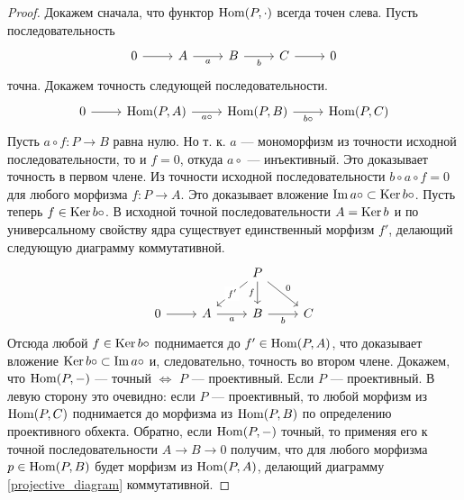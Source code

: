 \documentclass[../hw_main.tex]{subfiles}
\begin{document}
\begin{proof}
Докажем сначала, что функтор $\operatorname{Hom}(P, \cdot)$ всегда точен слева. Пусть последовательность
\begin{equation*}
    \begin{tikzcd}
	0 & A & B & C & 0
	\arrow[from=1-1, to=1-2]
	\arrow["a"', from=1-2, to=1-3]
	\arrow["b"', from=1-3, to=1-4]
	\arrow[from=1-4, to=1-5]
\end{tikzcd}
\end{equation*}
точна. Докажем точность следующей последовательности.
\begin{equation*}
    \begin{tikzcd}
	0 & {\Hom(P, A)} & {\Hom(P, B)} & {\Hom(P, C)}
	\arrow[from=1-1, to=1-2]
	\arrow["b\circ"', from=1-3, to=1-4]
	\arrow["a\circ"', from=1-2, to=1-3]
\end{tikzcd}
\end{equation*}
 Пусть $a\circ f:P\to B$ равна нулю. Но т. к. $a$ --- мономорфизм из точности исходной последовательности, то и $f=0$, откуда $a\circ$ --- инъективный. Это доказывает точность в первом члене.
Из точности исходной последовательности $b\circ a \circ f = 0$ для любого морфизма $f:P\to A$. Это доказывает вложение $\mathop{\mathrm{Im}}\nolimits a\circ \subset \mathop{\mathrm{Ker}}\nolimits b\circ$. Пусть теперь $f \in \mathop{\mathrm{Ker}}\nolimits b\circ$. В исходной точной последовательности $A = \mathop{\mathrm{Ker}}\nolimits b$ и по универсальному свойству ядра существует единственный морфизм $f'$, делающий следующую диаграмму коммутативной.
 \begin{equation}\label{projective_diagram}
     \begin{tikzcd}
	&& P \\
	0 & A & B & C
	\arrow["f"', from=1-3, to=2-3]
	\arrow["b"', from=2-3, to=2-4]
	\arrow["a"', from=2-2, to=2-3]
	\arrow["{f'}"{description}, from=1-3, to=2-2]
	\arrow[from=2-1, to=2-2]
	\arrow["0", from=1-3, to=2-4]
\end{tikzcd}
 \end{equation}
Отсюда любой $f\in \mathop{\mathrm{Ker}}\nolimits b\circ$ поднимается до $f' \in \operatorname{Hom}(P, A)$, что доказывает вложение $\mathop{\mathrm{Ker}}\nolimits b\circ \subset \mathop{\mathrm{Im}}\nolimits a\circ$ и, следовательно, точность во втором члене.
Докажем, что $\operatorname{Hom}(P, -)$ --- точный $\iff$ $P$ --- проективный. Если $P$ --- проективный. В левую сторону это очевидно: если $P$ --- проективный, то любой морфизм из $\operatorname{Hom} (P, C)$ поднимается до морфизма из $\operatorname{Hom} (P, B)$ по определению проективного обхекта. Обратно, если $\operatorname{Hom}(P, -)$ точный, то применяя его к точной последовательности $A\to B \to 0$ получим, что для любого морфизма $p\in \operatorname{Hom}(P, B)$ будет морфизм из $\operatorname{Hom}(P, A)$, делающий диаграмму \eqref{projective_diagram} коммутативной.
\end{proof}
\end{document}
